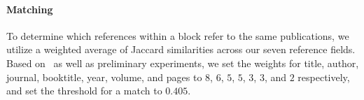 




\paragraph{Matching}

To determine which references within a block refer to the same publications, we utilize a weighted average of Jaccard similarities across our seven reference fields. Based on~\cite{Foufoulas2017} as well as preliminary experiments, we set the weights for title, author, journal, booktitle, year, volume, and pages to $8$, $6$, $5$, $5$, $3$, $3$, and $2$ respectively, and set the threshold for a match to $0.405$.

